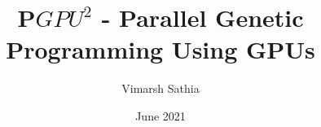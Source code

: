 \documentclass[BTech]{iitmdiss}
\begin{document}


\title{P$GPU^2$ - Parallel Genetic Programming Using GPUs}
\author{Vimarsh Sathia}
\date{June 2021}

\begin{singlespace}
\maketitle 
\end{singlespace} 







\begin{singlespace}
\tableofcontents
\thispagestyle{empty}

\listoftables
{}
\listoffigures
{}
\end{singlespace}


% 








% 
% 

\end{document}
